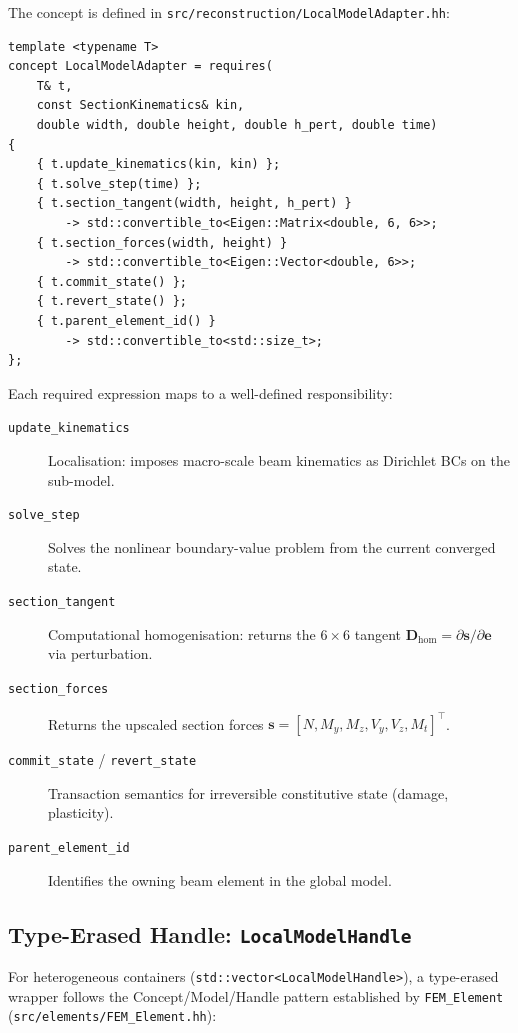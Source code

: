 The concept is defined in
\texttt{src/reconstruction/LocalModelAdapter.hh}:

\begin{lstlisting}[caption={C++20 concept for local sub-model solvers.},
                   label={lst:local-model-concept}]
template <typename T>
concept LocalModelAdapter = requires(
    T& t,
    const SectionKinematics& kin,
    double width, double height, double h_pert, double time)
{
    { t.update_kinematics(kin, kin) };
    { t.solve_step(time) };
    { t.section_tangent(width, height, h_pert) }
        -> std::convertible_to<Eigen::Matrix<double, 6, 6>>;
    { t.section_forces(width, height) }
        -> std::convertible_to<Eigen::Vector<double, 6>>;
    { t.commit_state() };
    { t.revert_state() };
    { t.parent_element_id() }
        -> std::convertible_to<std::size_t>;
};
\end{lstlisting}

Each required expression maps to a well-defined responsibility:
\begin{description}
  \item[\texttt{update\_kinematics}] Localisation: imposes macro-scale
    beam kinematics as Dirichlet BCs on the sub-model.
  \item[\texttt{solve\_step}] Solves the nonlinear boundary-value
    problem from the current converged state.
  \item[\texttt{section\_tangent}] Computational homogenisation:
    returns the $6\times6$ tangent $\mathbf{D}_{\mathrm{hom}} =
    \partial\mathbf{s}/\partial\mathbf{e}$ via perturbation.
  \item[\texttt{section\_forces}] Returns the upscaled section forces
    $\mathbf{s} = [N, M_y, M_z, V_y, V_z, M_t]^\top$.
  \item[\texttt{commit\_state} / \texttt{revert\_state}]
    Transaction semantics for irreversible constitutive state
    (damage, plasticity).
  \item[\texttt{parent\_element\_id}] Identifies the owning beam
    element in the global model.
\end{description}


\subsection{Type-Erased Handle: \texttt{LocalModelHandle}}
\label{sec:refactor-type-erasure}

For heterogeneous containers (\texttt{std::vector<LocalModelHandle>}),
a type-erased wrapper follows the Concept/Model/Handle pattern
established by \texttt{FEM\_Element}
(\texttt{src/elements/FEM\_Element.hh}):

